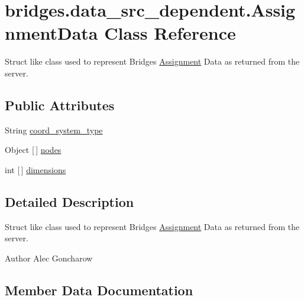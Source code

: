 \hypertarget{classbridges_1_1data__src__dependent_1_1_assignment_data}{}\section{bridges.\+data\+\_\+src\+\_\+dependent.\+Assignment\+Data Class Reference}
\label{classbridges_1_1data__src__dependent_1_1_assignment_data}


Struct like class used to represent Bridges \mbox{\hyperlink{classbridges_1_1data__src__dependent_1_1_assignment}{Assignment}} Data as returned from the server.  


\subsection*{Public Attributes}
\begin{DoxyCompactItemize}
\item 
String \mbox{\hyperlink{classbridges_1_1data__src__dependent_1_1_assignment_data_a6734aba0f017aca0024fcd80905be4f4}{coord\+\_\+system\+\_\+type}}
\item 
Object \mbox{[}$\,$\mbox{]} \mbox{\hyperlink{classbridges_1_1data__src__dependent_1_1_assignment_data_a1d7c23816a57cf9b3bd1bc0b53f15e8e}{nodes}}
\item 
int \mbox{[}$\,$\mbox{]} \mbox{\hyperlink{classbridges_1_1data__src__dependent_1_1_assignment_data_ab4aa179a24395748542f6fb64307132c}{dimensions}}
\end{DoxyCompactItemize}


\subsection{Detailed Description}
Struct like class used to represent Bridges \mbox{\hyperlink{classbridges_1_1data__src__dependent_1_1_assignment}{Assignment}} Data as returned from the server. 

\begin{DoxyAuthor}{Author}
Alec Goncharow 
\end{DoxyAuthor}


\subsection{Member Data Documentation}
\mbox{\label{classbridges_1_1data__src__dependent_1_1_assignment_data_a6734aba0f017aca0024fcd80905be4f4}} 
